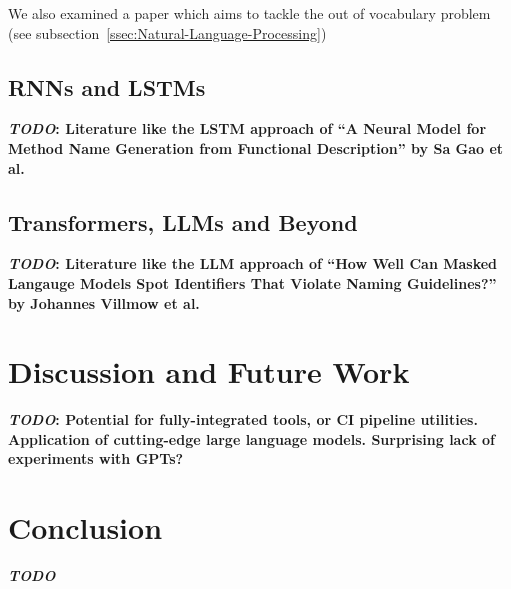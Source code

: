 \documentclass[conference]{IEEEtran}
\newcommand{\TODO}[1]{\textbf{\textcolor{Bittersweet}{#1}}\xspace}
\newcommand{\TODOM}[1]{\TODO{\emph{TODO}: #1}\xspace}
\newcommand{\TODOB}{\TODO{\emph{TODO}}\xspace}
\begin{document}
We also examined a paper which aims to tackle the out of vocabulary problem (see
subsection~\ref{ssec:Natural-Language-Processing})


\subsection{RNNs and LSTMs}
\label{ssec:RNNs and LSTMs}
\TODOM{Literature like the LSTM approach of ``A Neural Model for Method Name Generation
from Functional Description'' by Sa Gao et al.\cite{Gao2019IdentGen}}

\subsection{Transformers, LLMs and Beyond}
\label{ssec:LLMs-and-Beyond}
\TODOM{Literature like the LLM approach of ``How Well Can Masked Langauge Models Spot
Identifiers That Violate Naming Guidelines?'' by Johannes Villmow et
al.\cite{Villmow2023Violations}}


\section{Discussion and Future Work}
\label{sec:Discussion-and-Future-Work}

\TODOM{Potential for fully-integrated tools, or CI pipeline utilities. Application of
cutting-edge large language models. Surprising lack of experiments with GPTs?}

\section{Conclusion}
\label{sec:Conclusion}

\TODOB


\nocite{*}


\end{document}
